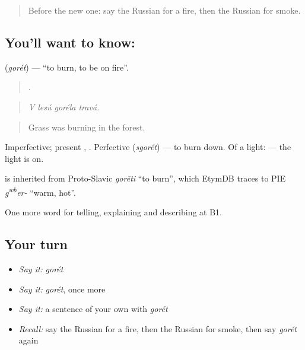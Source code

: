 \label{lesson:RU-C295-goret}



\begin{quote}
Before the new one: say the Russian for a fire, then the Russian for smoke.
\end{quote}

\subsection*{You'll want to know: }
\textbf{} (\emph{gorét}) — \textquotedblleft{}to burn, to be on fire\textquotedblright{}.

\begin{quote}
   .
\end{quote}

\begin{quote}
\emph{V lesú goréla travá.}
\end{quote}

\begin{quote}
Grass was burning in the forest.
\end{quote}

Imperfective; present \emph{}, \emph{}. Perfective \emph{} (\emph{sgorét}) — to burn down. Of a light: \emph{ } — the light is on.

\begin{cousinweb}
\emph{} is inherited from Proto-Slavic \emph{gorěti} \textquotedblleft{}to burn\textquotedblright{}, which EtymDB traces to PIE \emph{g\textsuperscript{w}\textsuperscript{h}er-} \textquotedblleft{}warm, hot\textquotedblright{}.
\end{cousinweb}

\begin{grammarlens}[title={What you've built}]
One more word for telling, explaining and describing at B1.
\end{grammarlens}

\subsection*{Your turn}
\begin{itemize}
\raggedright
  \item \emph{Say it:} \emph{gorét}
  \item \emph{Say it:} \emph{gorét}, once more
  \item \emph{Say it:} a sentence of your own with \emph{gorét}
  \item \emph{Recall:} say the Russian for a fire, then the Russian for smoke, then say \emph{gorét} again
\end{itemize}

